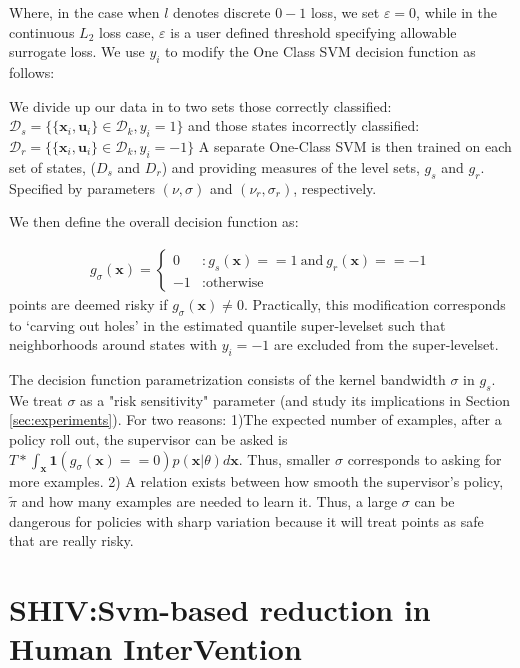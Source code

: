 \documentclass[10pt, conference]{ieeeconf}      %
\newcommand{\bu}{\mathbf{u}}
\newcommand{\bx}{\mathbf{x}}
\begin{document}
Where, in the case when $l$ denotes discrete $0-1$ loss, we set $\varepsilon = 0$, while in the continuous $L_2$ loss
case, $\varepsilon$ is a user defined threshold specifying allowable surrogate loss.
We use $y_i$ to modify the One Class SVM decision function as follows: 


We divide up our data in to two sets those correctly classified: $\mathcal{D}_{s}=\{\lbrace \bx_i,\bu_i \rbrace \in \mathcal{D}_{k}, y_i=1\}$ and those states incorrectly classified: $\mathcal{D}_{r}=\{\lbrace \bx_i,\bu_i \rbrace \in \mathcal{D}_{k}, y_i=-1\}$
A separate One-Class SVM is then trained on each set of states, ($D_{s}$ and $D_{r}$) and providing measures of the level sets, $g_{s}$ and $g_{r}$. Specified by parameters $(\nu,\sigma)$ and $(\nu_r,\sigma_r)$, respectively. 

We then define the overall decision function as:

\vspace{-2ex}
\begin{align}\label{eq:decision_func}
g_{\sigma}(\bx) = \left\{
     \begin{array}{ll}
         0 & : g_s(\bx) == 1 \: \mbox{and} \: g_r(\bx) == -1\\
         -1 & : \mbox{otherwise}
     \end{array}
   \right.
\end{align}
points are deemed risky if $g_{\sigma}(\bx) \neq 0$.  Practically, this modification corresponds to
`carving out holes' in the estimated quantile super-levelset such that neighborhoods around states with $y_i=-1$ are
excluded from the super-levelset. 


The decision function parametrization consists of the kernel bandwidth $\sigma$ in $g_s$. We treat $\sigma$ as a "risk sensitivity" parameter (and study its implications in Section \ref{sec:experiments}). For two reasons: 1)The expected number of examples, after a policy roll out, the supervisor can be asked is  $T*\int_\bx \mathbf{1}(g_{\sigma}(\bx) == 0) p(\bx|\theta)d\bx$. Thus, smaller $\sigma$ corresponds to asking for more examples. 2) A relation exists between how smooth the supervisor's policy, $\tilde{\pi}$ and how many examples are needed to learn it. Thus, a large $\sigma$ can be dangerous for policies with sharp variation because it will treat points as safe that are really risky. 

\section{SHIV:Svm-based reduction in Human InterVention} \label{sec:SHIV}
\end{document}
